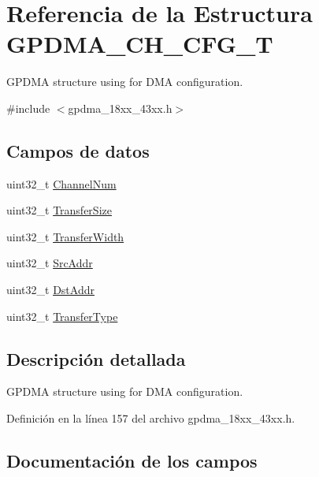 \hypertarget{struct_g_p_d_m_a___c_h___c_f_g___t}{}\section{Referencia de la Estructura G\+P\+D\+M\+A\+\_\+\+C\+H\+\_\+\+C\+F\+G\+\_\+T}
\label{struct_g_p_d_m_a___c_h___c_f_g___t}


G\+P\+D\+MA structure using for D\+MA configuration.  




{\ttfamily \#include $<$gpdma\+\_\+18xx\+\_\+43xx.\+h$>$}

\subsection*{Campos de datos}
\begin{DoxyCompactItemize}
\item 
uint32\+\_\+t \hyperlink{struct_g_p_d_m_a___c_h___c_f_g___t_aa3166850f4797686bb04226d148742fd}{Channel\+Num}
\item 
uint32\+\_\+t \hyperlink{struct_g_p_d_m_a___c_h___c_f_g___t_aba6866821aad613d4dbe63ecfaff4cb4}{Transfer\+Size}
\item 
uint32\+\_\+t \hyperlink{struct_g_p_d_m_a___c_h___c_f_g___t_a0cb76a8204c8f81b9ac1ab3c8840c499}{Transfer\+Width}
\item 
uint32\+\_\+t \hyperlink{struct_g_p_d_m_a___c_h___c_f_g___t_a6e644599a1ad75e09ff2ed801d2b3f45}{Src\+Addr}
\item 
uint32\+\_\+t \hyperlink{struct_g_p_d_m_a___c_h___c_f_g___t_ae83c3b6dde756c02f1281fbc925ea5d8}{Dst\+Addr}
\item 
uint32\+\_\+t \hyperlink{struct_g_p_d_m_a___c_h___c_f_g___t_a711b7e6de8a76224343e9a8f31d5128e}{Transfer\+Type}
\end{DoxyCompactItemize}


\subsection{Descripción detallada}
G\+P\+D\+MA structure using for D\+MA configuration. 

Definición en la línea 157 del archivo gpdma\+\_\+18xx\+\_\+43xx.\+h.



\subsection{Documentación de los campos}

